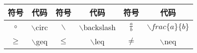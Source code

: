 \documentclass[UTF8,fontset=ubuntu]{ctexart}
\begin{document}
\begin{tabular}{c|c|c|c|c|c}
	\hline
	符号 & 代码 & 符号 & 代码 & 符号 & 代码\\
	\hline
	$\circ$ & $\backslash$circ & $\backslash$ & $\backslash$backslash & $\frac{a}{b}$ & $\backslash frac\{a\}\{b\}$\\
        $\geq$ & $\backslash$geq & $\leq$ & $\backslash$leq & $\neq$ & $\backslash$neq
\end{tabular}
\end{document}
